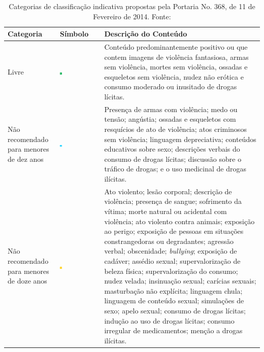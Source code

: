 \begin{table}[!ht]
  \caption{Categorias de classificação indicativa propostas pela Portaria No. 368, de 11 de Fevereiro de 2014. Fonte: \cite{ci:guia}}
  \label{tab:categorias}
	\centering
	\begin{tabular}{p{4cm} p{1.5cm} p{8cm}}
		\hline
		\textbf{Categoria} & \textbf{Símbolo} & \textbf{Descrição do Conteúdo} \\
		\hline
		Livre & \vfill\includegraphics[width=0.05\textwidth]{img/livre.png} \vfill&
				Conteúdo predominantemente positivo ou que contem imagens de violência fantasiosa, armas sem violência, mortes sem violência, ossadas e esqueletos sem violência, nudez não erótica e consumo moderado ou inusitado de drogas lícitas. \\
		\hline
		Não recomendado para menores de dez anos &\vfill \includegraphics[width=0.05\textwidth]{img/10anos.png}\vfill &
		 		Presença de armas com violência; medo ou tensão; angústia; ossadas e esqueletos com resquícios de ato de violência; atos criminosos sem violência; linguagem depreciativa; conteúdos educativos sobre sexo; descrições verbais do consumo de drogas lícitas; discussão sobre o tráfico de drogas; e o uso medicinal de drogas ilícitas.\\
		\hline
		Não recomendado para menores de doze anos &\vfill \includegraphics[width=0.05\textwidth]{img/12anos.png}\vfill &
				Ato violento; lesão corporal; descrição de violência; presença de sangue; sofrimento da vítima; morte natural ou acidental com violência; ato violento contra animais; exposição ao perigo; exposição de pessoas em situações constrangedoras ou degradantes; agressão verbal; obscenidade; \emph{bullying}; exposição de cadáver; assédio sexual; supervalorização de beleza física; supervalorização do consumo; nudez velada; insinuação sexual; carícias sexuais; masturbação não explícita; linguagem chula; linguagem de conteúdo sexual; simulações de sexo; apelo sexual; consumo de drogas lícitas; indução ao uso de drogas lícitas; consumo irregular de medicamentos; menção a drogas ilícitas.\\

\end{tabular}
\end{table}
